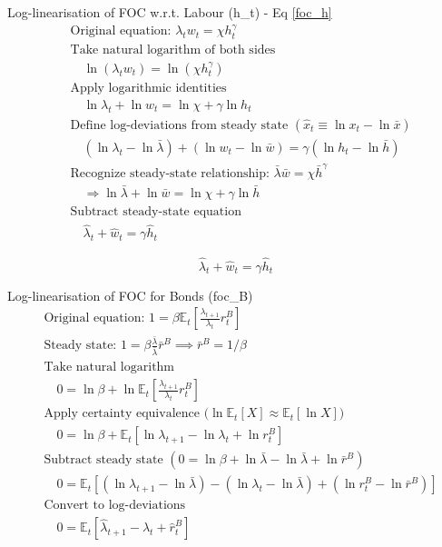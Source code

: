 \documentclass[11pt,preprint]{elsarticle}
\numberwithin{equation}{section}
\numberwithin{figure}{section}
\numberwithin{table}{section}
\begin{document}
Log-linearisation of FOC w.r.t. Labour (h\_t) - Eq \ref{foc_h}
\begin{align*}
& \text{Original equation: } \lambda_t w_t = \chi h_t^{\gamma} \\[6pt]
& \text{Take natural logarithm of both sides} \\
& \quad \ln(\lambda_t w_t) = \ln(\chi h_t^{\gamma}) \\[6pt]
& \text{Apply logarithmic identities} \\
& \quad \ln \lambda_t + \ln w_t = \ln \chi + \gamma \ln h_t \\[6pt]
& \text{Define log-deviations from steady state } (\hat{x}_t \equiv \ln x_t - \ln \bar{x}) \\
& \quad (\ln \lambda_t - \ln \bar{\lambda}) + (\ln w_t - \ln \bar{w}) = \gamma (\ln h_t - \ln \bar{h}) \\[6pt]
& \text{Recognize steady-state relationship: } \bar{\lambda}\bar{w} = \chi \bar{h}^{\gamma} \\
& \quad \Rightarrow \ln \bar{\lambda} + \ln \bar{w} = \ln \chi + \gamma \ln \bar{h} \\[6pt]
& \text{Subtract steady-state equation} \\
& \quad \hat{\lambda}_t + \hat{w}_t = \gamma \hat{h}_t
\end{align*}

\begin{equation}\label{foc_h_linearised_app}
\boxed{\hat{\lambda}_t + \hat{w}_t = \gamma \hat{h}_t}
\end{equation}

Log-linearisation of FOC for Bonds (foc\_B) \begin{align*}
& \text{Original equation: } 1 = \beta \mathbb{E}_t \left[ \frac{\lambda_{t+1}}{\lambda_t} r^B_t \right] \\[6pt]
& \text{Steady state: } 1 = \beta \frac{\bar{\lambda}}{\bar{\lambda}} \bar{r}^B \implies \bar{r}^B = 1/\beta \\[6pt]
& \text{Take natural logarithm} \\
& \quad 0 = \ln \beta + \ln \mathbb{E}_t \left[ \frac{\lambda_{t+1}}{\lambda_t} r^B_t \right] \\[6pt]
& \text{Apply certainty equivalence (}\ln \mathbb{E}_t[X] \approx \mathbb{E}_t[\ln X]\text{)} \\
& \quad 0 = \ln \beta + \mathbb{E}_t \left[ \ln \lambda_{t+1} - \ln \lambda_t + \ln r^B_t \right] \\[6pt]
& \text{Subtract steady state } (0 = \ln \beta + \ln \bar{\lambda} - \ln \bar{\lambda} + \ln \bar{r}^B) \\
& \quad 0 = \mathbb{E}_t \left[ (\ln \lambda_{t+1} - \ln \bar{\lambda}) - (\ln \lambda_t - \ln \bar{\lambda}) + (\ln r^B_t - \ln \bar{r}^B) \right] \\[6pt]
& \text{Convert to log-deviations} \\
& \quad 0 = \mathbb{E}_t \left[ \hat{\lambda}_{t+1} - \hat{\lambda}_t + \hat{r}^B_t \right]
\end{align*}
\end{document}
